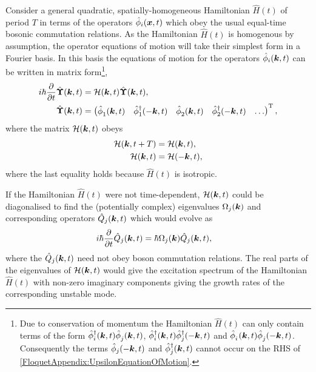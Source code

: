 Consider a general quadratic, spatially-homogeneous Hamiltonian $\hat{H}(t)$ of period $T$ in terms of the operators $\hat{\phi}_i(\bm{x}, t)$ which obey the usual equal-time bosonic commutation relations. As the Hamiltonian $\hat{H}(t)$ is homogenous by assumption, the operator equations of motion will take their simplest form in a Fourier basis. In this basis the equations of motion for the operators $\hat{\phi}_i(\bm{k}, t)$ can be written in matrix form\footnote{Due to conservation of momentum the Hamiltonian $\hat{H}(t)$ can only contain terms of the form $\hat{\phi}_i^\dagger(\bm{k}, t) \hat{\phi}_j^{\phantom{\dagger}}(\bm{k}, t)$, $\hat{\phi}_i^\dagger(\bm{k}, t) \hat{\phi}_j^{\dagger}(-\bm{k}, t)$ and $\hat{\phi}_i^{\phantom{\dagger}}(\bm{k}, t) \hat{\phi}_j^{\phantom{\dagger}}(-\bm{k}, t)$. Consequently the terms $\hat{\phi}_j(-\bm{k}, t)$ and $\hat{\phi}_j^\dagger(\bm{k}, t)$ cannot occur on the RHS of \eqref{FloquetAppendix:UpsilonEquationOfMotion}.},
\begin{subequations}
    \label{FloquetAppendix:MatrixOperatorEvolution}
    \begin{align}
        i \hbar \frac{\partial }{\partial t}\hat{\vect{\Upsilon}}(\vect{k}, t) &= \mathcal{H}(\vect{k}, t) \hat{\vect{\Upsilon}}(\vect{k}, t), \label{FloquetAppendix:UpsilonEquationOfMotion}\\
        \hat{\vect{\Upsilon}}(\vect{k}, t) &= 
        \begin{pmatrix}
            \hat{\phi}_1^{\phantom{\dagger}}(\vect{k}, t) &
            \hat{\phi}_1^\dagger(-\vect{k}, t) &
            \hat{\phi}_2^{\phantom{\dagger}}(\vect{k}, t) &
            \hat{\phi}_2^\dagger(-\vect{k}, t) &
            \dots
        \end{pmatrix}^\text{T},
    \end{align}
\end{subequations}
where the matrix $\mathcal{H}(\bm{k}, t)$ obeys
\begin{align}
        \mathcal{H}(\vect{k}, t+T) &= \mathcal{H}(\vect{k}, t),\\
        \mathcal{H}(\vect{k}, t) &= \mathcal{H}(-\vect{k}, t), \label{FloquetAppendix:HReflectionSymmetry}
\end{align}
where the last equality holds because $\hat{H}(t)$ is isotropic.

If the Hamiltonian $\hat{H}(t)$ were not time-dependent, $\mathcal{H}(\bm{k}, t)$ could be diagonalised to find the (potentially complex) eigenvalues $\Omega_j(\bm{k})$ and corresponding operators $\hat{Q}_j(\bm{k}, t)$ which would evolve as
\begin{align}
    \label{FloquetAppendix:ContinouousTimeEigenoperators}
    i \hbar \frac{\partial }{\partial t}\hat{Q}_j(\vect{k}, t) &= \hbar \Omega_j(\vect{k}) \hat{Q}_j(\vect{k}, t),
\end{align}
where the $\hat{Q}_j(\bm{k}, t)$ need not obey boson commutation relations. The real parts of the eigenvalues of $\mathcal{H}(\bm{k}, t)$ would give the excitation spectrum of the Hamiltonian $\hat{H}(t)$ with non-zero imaginary components giving the growth rates of the corresponding unstable mode.

